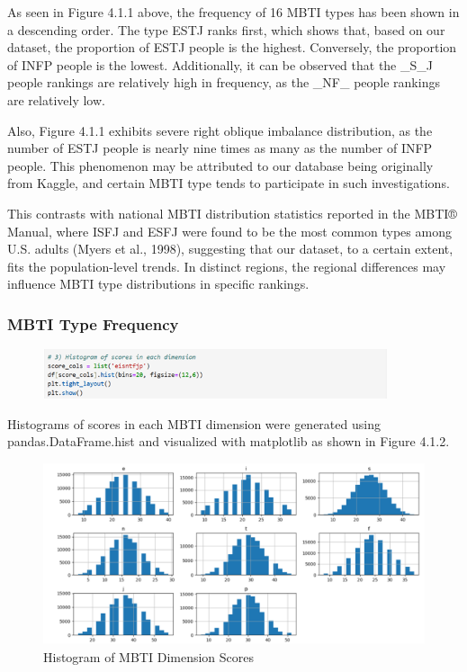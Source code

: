 \documentclass[12pt]{article}
\begin{document}
	As seen in Figure 4.1.1 above, the frequency of 16 MBTI types has been shown in a descending order. The type ESTJ ranks first, which shows that, based on our dataset, the proportion of ESTJ people is the highest. Conversely, the proportion of INFP people is the lowest. Additionally, it can be observed that the \_S\_J people rankings are relatively high in frequency, as the \_NF\_ people rankings are relatively low.
	
	Also, Figure 4.1.1 exhibits severe right oblique imbalance distribution, as the number of ESTJ people is nearly nine times as many as the number of INFP people. This phenomenon may be attributed to our database being originally from Kaggle, and certain MBTI type tends to participate in such investigations.
	
	This contrasts with national MBTI distribution statistics reported in the MBTI® Manual, where ISFJ and ESFJ were found to be the most common types among U.S. adults (Myers et al., 1998), suggesting that our dataset, to a certain extent, fits the population-level trends. In distinct regions, the regional differences may influence MBTI type distributions in specific rankings.
	
	\subsubsection{MBTI Type Frequency}
		\begin{figure}[H]
		\centering
		\includegraphics[width=0.9\textwidth]{Q1EDA3}
		
	\end{figure}
	
	Histograms of scores in each MBTI dimension were generated using pandas.DataFrame.hist and visualized with matplotlib as shown in Figure 4.1.2.
	\begin{figure}[H]
		\centering
		\includegraphics{Q1EDA4} 
		\caption{Histogram of MBTI Dimension Scores}		
	\end{figure}
	
\end{document}
